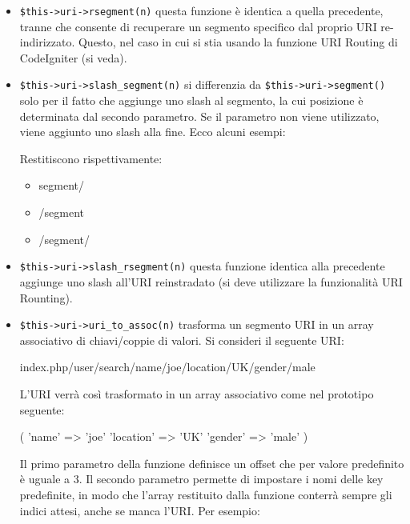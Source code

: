 \begin{itemize}
\item \verb|$this->uri->rsegment(n)| questa funzione è identica a quella precedente, tranne che consente di recuperare un segmento specifico dal proprio URI re-indirizzato. Questo, nel caso in cui si stia usando la funzione URI Routing di CodeIgniter (si veda).

\item \verb|$this->uri->slash_segment(n)| si differenzia  da \verb|$this->uri->segment()| solo per il fatto che aggiunge uno slash al segmento, la cui posizione è determinata dal secondo parametro. Se il parametro non viene utilizzato, viene aggiunto uno slash alla fine. Ecco alcuni esempi:


Restitiscono rispettivamente:

\begin{itemize}
\item segment/
\item /segment
\item /segment/
\end{itemize}

\item \verb|$this->uri->slash_rsegment(n)| questa funzione identica alla precedente aggiunge uno slash all'URI reinstradato (si deve utilizzare la funzionalità URI Rounting).

\item \verb|$this->uri->uri_to_assoc(n)| trasforma un segmento URI in un array associativo di chiavi/coppie di valori. Si consideri il seguente URI:

\begin{code}
index.php/user/search/name/joe/location/UK/gender/male
\end{code}

L'\ac{URI} verrà così trasformato in un array associativo come nel prototipo seguente:

\begin{code}
[array]
(
    'name' => 'joe'
    'location'	=> 'UK'
    'gender'	=> 'male'
)
\end{code}

Il primo parametro della funzione definisce un offset che per valore predefinito è uguale a 3. Il secondo parametro permette di impostare i nomi delle key predefinite, in modo che l'array restituito dalla funzione conterrà sempre gli indici attesi, anche se manca l'\ac{URI}. Per esempio:


\end{itemize}
